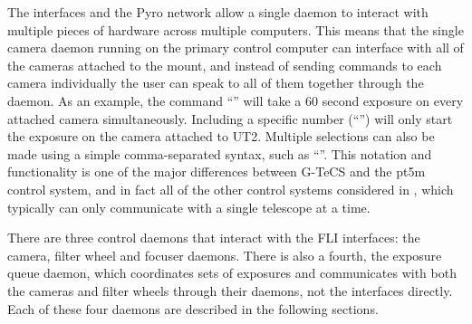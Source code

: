 \begin{colsection}
The interfaces and the Pyro network allow a single daemon to interact with multiple pieces of hardware across multiple computers. This means that the single camera daemon running on the primary control computer can interface with all of the cameras attached to the mount, and instead of sending commands to each camera individually the user can speak to all of them together through the daemon. As an example, the command ``'' will take a 60 second exposure on every attached camera simultaneously. Including a specific number (``'') will only start the exposure on the camera attached to UT2. Multiple selections can also be made using a simple comma-separated syntax, such as ``''. This notation and functionality is one of the major differences between G-TeCS and the pt5m control system, and in fact all of the other control systems considered in , which typically can only communicate with a single telescope at a time.

\newpage

There are three control daemons that interact with the FLI interfaces: the camera, filter wheel and focuser daemons. There is also a fourth, the exposure queue daemon, which coordinates sets of exposures and communicates with both the cameras and filter wheels through their daemons, not the interfaces directly. Each of these four daemons are described in the following sections.

\end{colsection}


